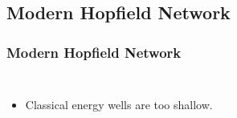 
\subsection{Modern Hopfield Network} 

\begin{frame}
	
    \frametitle{Modern Hopfield Network}
    \begin{columns}[c]
        \begin{itemize}
            \item Classical energy wells are too shallow.          
        \end{itemize}
        
        


\end{columns}
\end{frame}
